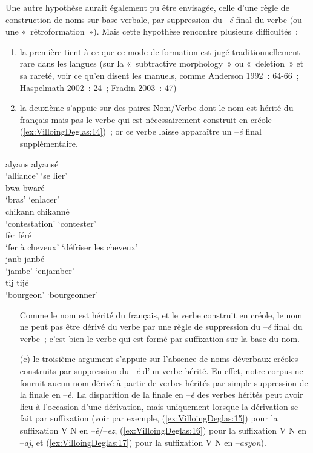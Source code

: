 \documentclass[output=paper]{langsci/langscibook}
\begin{document}
Une autre hypothèse aurait également pu être envisagée, celle d'une
règle de construction de noms sur base verbale, par suppression du
--\emph{é} final du verbe (ou une «~rétroformation~»). Mais cette
hypothèse rencontre plusieurs difficultés~:

\begin{enumerate}[label=(\alph*)]
\item la première tient à ce que ce mode de formation est jugé
traditionnellement rare dans les langues (sur la «~subtractive
morphology~» ou «~deletion~» et sa rareté, voir ce qu'en disent les
manuels, comme Anderson 1992~: 64-66~; Haspelmath 2002~: 24~; Fradin
2003~: 47)

\item la deuxième s'appuie sur des paires Nom/Verbe dont le nom est
hérité du français mais pas le verbe qui est nécessairement construit en
créole (\ref{ex:VilloingDeglas:14})~; or ce verbe laisse apparaître un --\emph{é} final
supplémentaire.
\end{enumerate}


\ea\label{ex:VilloingDeglas:14}
\ea \gll alyans \textrightarrow{} alyansé \\
  `alliance' {} {`se lier'}\\
\ex \gll bwa \textrightarrow{} bwaré \\
  `bras' {} {`enlacer'}\\
\ex \gll chikann \textrightarrow{} chikanné \\
  `contestation' {} {`contester'}\\
\ex \gll fèr \textrightarrow{} féré \\
  `fer à cheveux' {} {`défriser les cheveux'}\\
\ex \gll janb \textrightarrow{} janbé \\
  `jambe' {} {`enjamber'}\\
\ex \gll tij \textrightarrow{} tijé \\
  `bourgeon' {} {`bourgeonner'}\\
\z\z

\begin{enumerate}
\item[] Comme le nom est hérité du français, et le verbe construit en créole, le
nom ne peut pas être dérivé du verbe par une règle de suppression du
--\emph{é} final du verbe~; c'est bien le verbe qui est formé par
suffixation sur la base du nom.

\item[(c)] le troisième argument s'appuie sur l'absence de noms déverbaux
créoles construits par suppression du --\emph{é} d'un verbe hérité. En
effet, notre corpus ne fournit aucun nom dérivé à partir de verbes
hérités par simple suppression de la finale en --\emph{é.} La
disparition de la finale en --\emph{é} des verbes hérités peut avoir
lieu à l'occasion d'une dérivation, mais uniquement lorsque la
dérivation se fait par suffixation (voir par exemple, (\ref{ex:VilloingDeglas:15}) pour la
suffixation V\textrightarrow{} N en --\emph{è}/--\emph{ez}, (\ref{ex:VilloingDeglas:16}) pour la suffixation V\textrightarrow{} N
en --\emph{aj}, et (\ref{ex:VilloingDeglas:17}) pour la suffixation V\textrightarrow{} N en --\emph{asyon}).
\end{enumerate}
\end{document}
